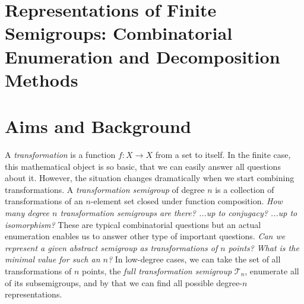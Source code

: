 \documentclass{amsart}
\newcommand{\FullTrans}{\mathcal T}
\begin{document}
\section*{Representations of Finite Semigroups: Combinatorial Enumeration and Decomposition Methods}

\section{Aims and Background}

A \emph{transformation} is a function $f:X\rightarrow X$ from a set to itself.
In the finite case, this mathematical object is so basic, that we can easily answer all questions about it.
However, the situation changes dramatically when we start combining transformations.
A \emph{transformation semigroup} of degree $n$ is a collection of transformations of an $n$-element set closed under function composition.
\emph{How many degree $n$ transformation semigroups are there? ...up to conjugacy? ...up to isomorphism?}
These are typical combinatorial questions but an actual enumeration enables us to answer other type of important questions.
\emph{Can we represent a given abstract semigroup as transformations of $n$ points?}
\emph{What is the minimal value for such an $n$?}
In low-degree cases,  we can take the set of all transformations of $n$ points, the \emph{full transformation semigroup} $\FullTrans_n$, enumerate all of its subsemigroups, and by that we can find all possible degree-$n$ representations. 
\end{document}
